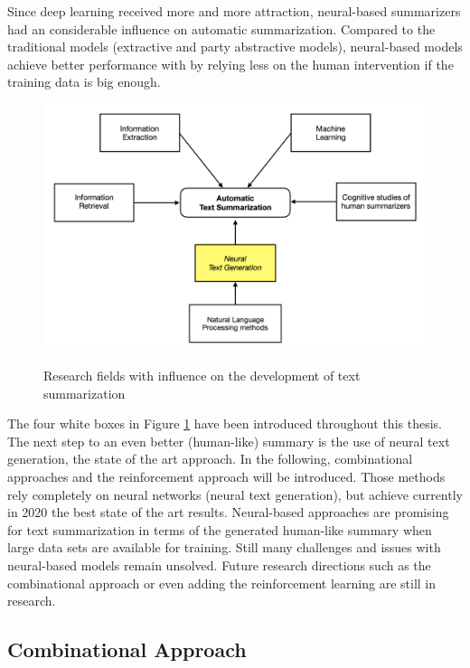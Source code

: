 Since deep learning received more and more attraction, neural-based summarizers had an considerable influence on automatic summarization. Compared to the traditional models (extractive and party abstractive models), neural-based models achieve better performance with by relying less on the human intervention if the training data is big enough.

\begin{figure}
	\begin{center}
		\includegraphics[width=5.5in]{photos/summ}\\
		\caption{Research fields with influence on the development of text summarization}\label{summ}
	\end{center}
\end{figure}

The four white boxes in Figure \ref{summ} have been introduced throughout this thesis. The next step to an even better (human-like) summary is the use of neural text generation, the state of the art approach. In the following, combinational approaches and the reinforcement approach will be introduced. Those methods rely completely on neural networks (neural text generation), but achieve currently in 2020 the best state of the art results. Neural-based approaches are promising for text summarization in terms of the generated human-like summary when large data sets are available for training. Still many challenges and issues with neural-based models remain unsolved. Future research directions such as the combinational approach or even adding the reinforcement learning are still in research.

\subsection{Combinational Approach}\label{ss:neuralgen}

